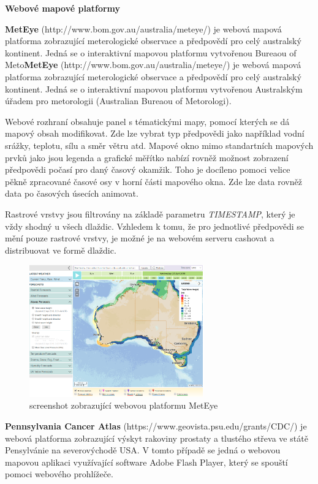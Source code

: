 \bigskip
\noindent
\textbf{Webové mapové platformy}

\textbf{MetEye} (http://www.bom.gov.au/australia/meteye/) je webová mapová platforma zobrazující meterologické observace a předpovědí pro celý australský kontinent. Jedná se o interaktivní mapovou platformu vytvořenou Bureaou of Meto\textbf{MetEye} (http://www.bom.gov.au/australia/meteye/) je webová mapová platforma zobrazující meterologické observace a předpovědí pro celý australský kontinent. Jedná se o interaktivní mapovou platformu vytvořenou Australským úřadem pro metorologii (Australian Bureaou of Metorologi).

Webové rozhraní obsahuje panel s tématickými mapy, pomocí kterých se dá mapový obsah modifikovat. Zde lze vybrat typ předpovědi jako například vodní srážky, teplotu, sílu a směr větru atd. Mapové okno mimo standartních mapových prvků jako jsou legenda a grafické měřítko nabízí rovněž možnost zobrazení předpovědi počasí pro daný časový okamžik. Toho je docíleno pomoci velice pěkně zpracované časové osy v horní části mapového okna. Zde lze data rovněž data po časových úsecích animovat.

Rastrové vrstvy jsou filtrovány na základě parametru \textit{TIMESTAMP}, který je vždy shodný u všech dlaždic. Vzhledem k tomu, že pro jednotlivé předpovědi se mění pouze rastrové vrstvy, je možné je na webovém serveru cashovat a distribuovat ve formě dlaždic. 

\begin{figure}[h!]
	\centering
	\includegraphics[width=0.67\textwidth]{../img/meteye.png}
	\caption{screenshot zobrazující webovou platformu MetEye}
	\label{fig:gay-sands}
\end{figure}

\textbf{Pennsylvania Cancer Atlas} (https://www.geovista.psu.edu/grants/CDC/) je webová platforma zobrazující výskyt rakoviny prostaty a tlustého střeva ve státě Pensylvánie na severovýchodě USA. V tomto případě se jedná o webovou mapovou aplikaci využívající software Adobe Flash Player, který se spouští pomoci webového prohlížeče. 

